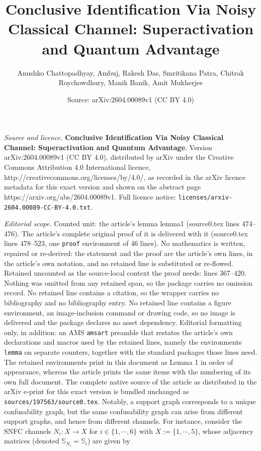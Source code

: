 \documentclass[10pt,a4paper]{amsart}
\title{\textbf{Conclusive Identification Via Noisy Classical Channel: Superactivation and Quantum Advantage}}
\author{Anushko Chattopadhyay, Ambuj, Rakesh Das, Smritikana Patra, Chitrak Roychowdhury, Manik Banik, Amit Mukherjee}
\date{Source: arXiv:2604.00089v1 (CC BY 4.0)}
\begin{document}
\maketitle

\noindent\emph{Source and licence.} \textbf{Conclusive Identification Via Noisy Classical Channel: Superactivation and Quantum Advantage}. Version arXiv:2604.00089v1 (CC BY 4.0), distributed by arXiv under the Creative Commons Attribution 4.0 International licence, http://creativecommons.org/licenses/by/4.0/, as recorded in the arXiv licence metadata for this exact version and shown on the abstract page https://arxiv.org/abs/2604.00089v1. Full licence notice: \texttt{licenses/arxiv-2604.00089-CC-BY-4.0.txt}.\par\smallskip

\noindent\textit{Editorial scope.} Counted unit: the article's lemma lemma1 (source0.tex lines 474--476). The article's complete original proof of it is delivered with it (source0.tex lines 478--523, one \texttt{proof} environment of 46 lines). No mathematics is written, repaired or re-derived: the statement and the proof are the article's own lines, in the article's own notation, and no retained line is substituted or re-flowed.  Retained uncounted as the source-local context the proof needs: lines 367--420.  Nothing was omitted from any retained span, so the package carries no omission record.  No retained line contains a citation, so the wrapper carries no bibliography and no bibliography entry.  No retained line contains a figure environment, an image-inclusion command or drawing code, so no image is delivered and the package declares no asset dependency.  Editorial formatting only, in addition: an AMS \texttt{amsart} preamble that restates the article's own declarations and macros used by the retained lines, namely the environments \texttt{lemma} on separate counters, together with the standard packages those lines need.  The retained environments print in this document as Lemma 1 in order of appearance, whereas the article prints the same items with the numbering of its own full document.  The complete native source of the article as distributed in the arXiv e-print for this exact version is bundled unchanged as \texttt{sources/197563/source0.tex}.
\noindent Notably, a support graph corresponds to a unique confusability graph, but the same confusability graph can arise from different support graphs, and hence from different channels. For instance, consider the SNFC channels $N_i : X \to X$ for $i \in \{1, \cdots, 6\}$ with $X := \{1,\cdots, 5\}$, whose adjacency matrices (denoted $\mathbb{S}_{N_i}=\mathbb{S}_i$) are given by
\end{document}
